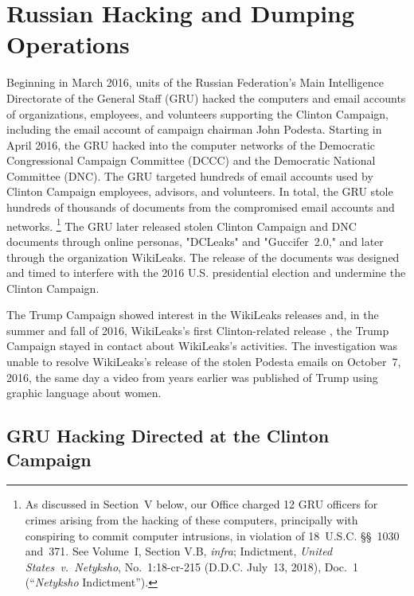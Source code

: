 \section{Russian Hacking and Dumping Operations}

Beginning in March 2016, units of the Russian Federation's Main Intelligence Directorate of the General Staff (GRU) hacked the computers and email accounts of organizations, employees, and volunteers supporting the Clinton Campaign, including the email account of campaign chairman John Podesta.
Starting in April 2016, the GRU hacked into the computer networks of the Democratic Congressional Campaign Committee (DCCC) and the Democratic National Committee (DNC).
The GRU targeted hundreds of email accounts used by Clinton Campaign employees, advisors, and volunteers.
In total, the GRU stole hundreds of thousands of documents from the compromised email accounts and networks.%
\footnote{As discussed in Section~V below, our Office charged 12 GRU officers for crimes arising from the hacking of these computers, principally with conspiring to commit computer intrusions, in violation of
18~U.S.C. \S\S~1030 and~371.
See Volume~I, Section V.B, \textit{infra};
Indictment, \textit{United States~v.\ Netyksho}, No.~1:18-cr-215 (D.D.C. July~13, 2018), Doc.~1 (``\textit{Netyksho} Indictment'').}
The GRU later released stolen Clinton Campaign and DNC documents through online personas, "DCLeaks" and "Guccifer~2.0," and later through the organization WikiLeaks.
The release of the documents was designed and timed to interfere with the 2016 U.S. presidential election and undermine the Clinton Campaign.

The Trump Campaign showed interest in the WikiLeaks releases and, in the summer and fall of 2016, 
WikiLeaks's first Clinton-related release , the Trump Campaign stayed in contact  about WikiLeaks's activities.
The investigation was unable to resolve 
WikiLeaks's release of the stolen Podesta emails on October~7, 2016, the same day a video from years earlier was published of Trump using graphic language about women.

\subsection{GRU Hacking Directed at the Clinton Campaign}

